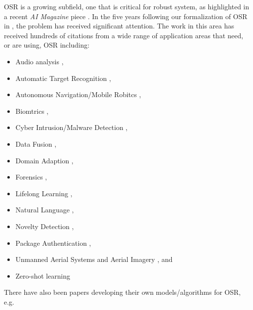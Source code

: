 \documentclass[letterpaper]{article}
\begin{document}
OSR is a growing subfield, one that is critical for robust system, as highlighted in a recent {\em AI Magazine} piece \cite{dietterich2017steps}. In the five years following our formalization of OSR in  \cite{Walter_openset}, the problem has received significant attention. The work in this area has received hundreds of citations from a wide range of application areas that need, or are using, OSR including:
{\small
\begin{itemize}[nosep]
\item Audio analysis \cite{battaglino_open-set_2016,krstulovic_audio_2018},
\item Automatic Target Recognition \cite{scherreik_open_2016,scherreik_multi-class_2016,roos_probabilistic_2017},
\item Autonomous Navigation/Mobile Robitcs  \cite{zamora_novel_2016,sunderhauf_place_2016}, 
\item Biomtrics \cite{chiachia_learning_2014,pinto_using_2015,rattani_open_2015,juefei-xu_multi-class_2016,gunther_toward_2017,perera_extreme_2017,bao2018towards}, 
\item Cyber Intrusion/Malware Detection \cite{henrydoss_incremental_2017,cruz_open_2017,rudd_survey_2017},
\item Data Fusion \cite{neira_data-fusion_2018},
\item Domain Adaption \cite{gopalan_domain_2015,busto_open_2017}, 
\item Forensics \cite{costa_open_2014,rocha_authorship_2017,navarro_connecting_2018},
\item Lifelong Learning  \cite{chen_lifelong_2016,rebuffi_icarl:_2017},
\item Natural Language \cite{prakhya_open-set_2017,doan_overcoming_2017,grave_unbounded_2017}, 
\item Novelty Detection  \cite{bodesheim_local_2015,lazzaretti_novelty_2016,schultheiss_finding_2017},
\item Package Authentication \cite{schraml_feasibility_2017},  
\item Unmanned Aerial Systems and Aerial Imagery \cite{poitevin_challenges_2017,bapst_open_2017},
and
\item Zero-shot learning  \cite{lampert_attribute-based_2014,chao_empirical_2016,xian_zero-shot_2017,fu_recent_2018,xian_zero-shot_2018}
\end{itemize}
}
There have also been papers developing their own models/algorithms for OSR, e.g. 
\cite{cardoso_bounded_2015,liu_modular_2016,ferreira_convolutional_2017,zhang_sparse_2017,mu_classification_2017,gunther2017unconstrained,neal2018open,bansal2018coverage}
\end{document}

